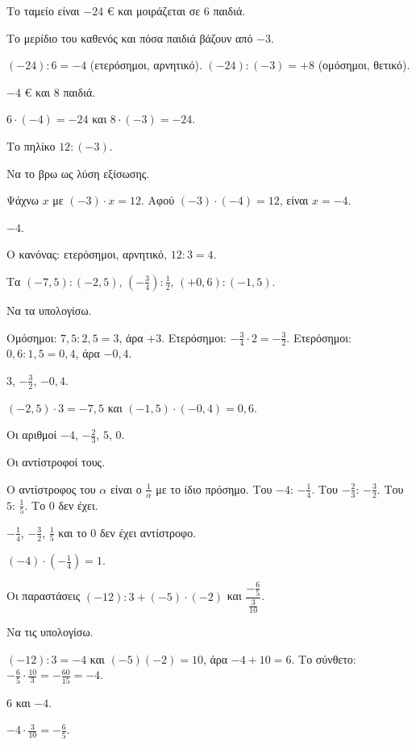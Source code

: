 
\tixero Το ταμείο είναι $-24$ € και μοιράζεται σε $6$ παιδιά.\par
\tithelo Το μερίδιο του καθενός και πόσα παιδιά βάζουν από $-3$.\par
\possindeo $(-24):6=-4$ (ετερόσημοι, αρνητικό). $(-24):(-3)=+8$ (ομόσημοι, θετικό).\par
\apantisi $-4$ € και $8$ παιδιά.\par
\elegxos $6\cdot(-4)=-24$ και $8\cdot(-3)=-24$.

\tixero Το πηλίκο $12:(-3)$.\par
\tithelo Να το βρω ως λύση εξίσωσης.\par
\possindeo Ψάχνω $x$ με $(-3)\cdot x=12$. Αφού $(-3)\cdot(-4)=12$, είναι $x=-4$.\par
\apantisi $-4$.\par
\elegxos Ο κανόνας: ετερόσημοι, αρνητικό, $12:3=4$.

\tixero Τα $(-7{,}5):(-2{,}5)$, $\left(-\frac{3}{4}\right):\frac{1}{2}$, $(+0{,}6):(-1{,}5)$.\par
\tithelo Να τα υπολογίσω.\par
\possindeo Ομόσημοι: $7{,}5:2{,}5=3$, άρα $+3$. Ετερόσημοι: $-\frac{3}{4}\cdot2=-\frac{3}{2}$. Ετερόσημοι: $0{,}6:1{,}5=0{,}4$, άρα $-0{,}4$.\par
\apantisi $3$, $-\frac{3}{2}$, $-0{,}4$.\par
\elegxos $(-2{,}5)\cdot3=-7{,}5$ και $(-1{,}5)\cdot(-0{,}4)=0{,}6$.

\tixero Οι αριθμοί $-4$, $-\frac{2}{3}$, $5$, $0$.\par
\tithelo Οι αντίστροφοί τους.\par
\possindeo Ο αντίστροφος του $\alpha$ είναι ο $\frac{1}{\alpha}$ με το ίδιο πρόσημο. Του $-4$: $-\frac{1}{4}$. Του $-\frac{2}{3}$: $-\frac{3}{2}$. Του $5$: $\frac{1}{5}$. Το $0$ δεν έχει.\par
\apantisi $-\frac{1}{4}$, $-\frac{3}{2}$, $\frac{1}{5}$ και το $0$ δεν έχει αντίστροφο.\par
\elegxos $(-4)\cdot\left(-\frac{1}{4}\right)=1$.

\tixero Οι παραστάσεις $(-12):3+(-5)\cdot(-2)$ και $\dfrac{-\frac{6}{5}}{\frac{3}{10}}$.\par
\tithelo Να τις υπολογίσω.\par
\possindeo $(-12):3=-4$ και $(-5)(-2)=10$, άρα $-4+10=6$. Το σύνθετο: $-\frac{6}{5}\cdot\frac{10}{3}=-\frac{60}{15}=-4$.\par
\apantisi $6$ και $-4$.\par
\elegxos $-4\cdot\frac{3}{10}=-\frac{6}{5}$.

